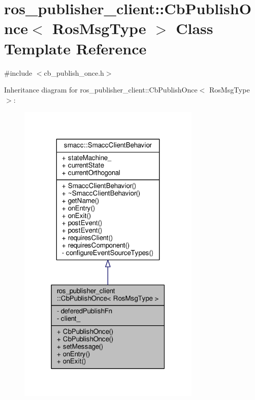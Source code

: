 \hypertarget{classros__publisher__client_1_1CbPublishOnce}{}\section{ros\+\_\+publisher\+\_\+client\+:\+:Cb\+Publish\+Once$<$ Ros\+Msg\+Type $>$ Class Template Reference}
\label{classros__publisher__client_1_1CbPublishOnce}


{\ttfamily \#include $<$cb\+\_\+publish\+\_\+once.\+h$>$}



Inheritance diagram for ros\+\_\+publisher\+\_\+client\+:\+:Cb\+Publish\+Once$<$ Ros\+Msg\+Type $>$\+:\nopagebreak
\begin{figure}[H]
\begin{center}
\leavevmode
\includegraphics[width=247pt]{classros__publisher__client_1_1CbPublishOnce__inherit__graph}
\end{center}
\end{figure}


